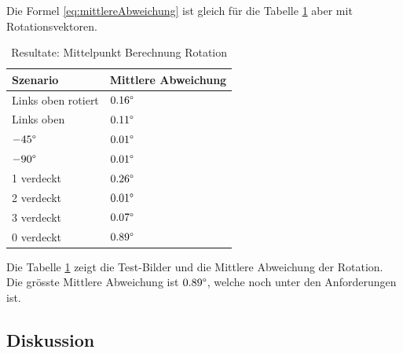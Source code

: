Die Formel \ref{eq:mittlereAbweichung} ist gleich für die Tabelle \ref{tab:MittelpunktRotation} aber mit Rotationsvektoren.

\begin{table}[!htb]
    \caption{Resultate: Mittelpunkt Berechnung Rotation}
    \label{tab:MittelpunktRotation}
    \begin{tabular}{|l|l|}
            \hline
            Szenario &  Mittlere Abweichung\\
            \hline
            Links oben rotiert & \(0.16\degree\)\\
            \hline
            Links oben & \(0.11\degree\)\\
            \hline
            \(-45 \degree\) & \(0.01\degree\)\\
            \hline
            \(-90 \degree\) & \(0.01\degree\)\\
            \hline
            1 verdeckt & \(0.26\degree\)\\
            \hline
            2 verdeckt & \(0.01\degree\)\\
            \hline
            3 verdeckt & \(0.07\degree\)\\
            \hline
            0 verdeckt & \(0.89\degree\)\\
            \hline
    \end{tabular}
\end{table}

Die Tabelle \ref{tab:MittelpunktRotation} zeigt die Test-Bilder und die Mittlere Abweichung der Rotation.
Die grösste Mittlere Abweichung ist \(0.89\degree\), welche noch unter den Anforderungen ist.


\subsection{Diskussion}